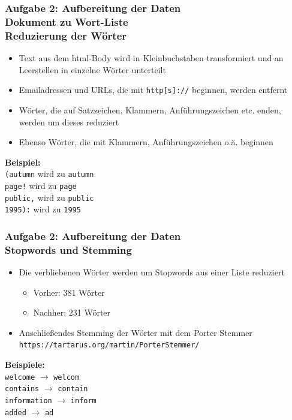 \documentclass[accentcolor=tud7b,noresetcounter]{tudbeamer}
\begin{document}
	\begin{frame}
		\frametitle{Aufgabe 2: Aufbereitung der Daten\\Dokument zu Wort-Liste\\Reduzierung der Wörter}
		\begin{itemize}
			\item Text aus dem html-Body wird in Kleinbuchstaben transformiert und an Leerstellen in einzelne Wörter unterteilt
			\item Emailadressen und URLs, die mit \texttt{http[s]://} beginnen, werden entfernt
			\item Wörter, die auf Satzzeichen, Klammern, Anführungszeichen etc. enden, werden um dieses reduziert
			\item Ebenso Wörter, die mit Klammern, Anführungszeichen o.ä. beginnen
		\end{itemize}
		\textbf{Beispiel:}\\
		\texttt{(autumn} wird zu \texttt{autumn}\\
		\texttt{page!} wird zu \texttt{page}\\
		\texttt{public,} wird zu \texttt{public}\\
		\texttt{1995):} wird zu \texttt{1995}
	\end{frame}
	
	\begin{frame}
		\frametitle{Aufgabe 2: Aufbereitung der Daten\\Stopwords und Stemming}
		\begin{itemize}
			\item Die verbliebenen Wörter werden um Stopwords aus einer Liste reduziert
			\begin{itemize}
				\item Vorher: 381 Wörter
				\item Nachher: 231 Wörter
			\end{itemize}
			\item Anschließendes Stemming der Wörter mit dem Porter Stemmer\\\texttt{https://tartarus.org/martin/PorterStemmer/}
		\end{itemize}
		\textbf{Beispiele:}\\
			\texttt{welcome} $\rightarrow$ \texttt{welcom}\\
			\texttt{contains} $\rightarrow$ \texttt{contain}\\
			\texttt{information} $\rightarrow$ \texttt{inform}\\
			\texttt{added} $\rightarrow$ \texttt{ad}\\
			
	\end{frame}
	
\end{document}
